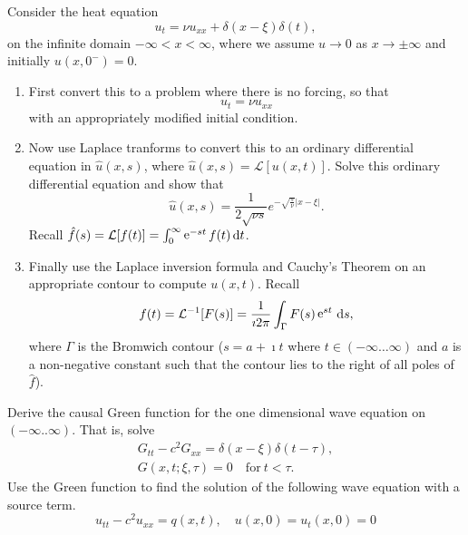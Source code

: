 {\begin{Exercise}
  Consider the heat equation
  \[ 
  u_t = \nu u_{x x} + \delta(x-\xi) \delta(t), 
  \]
  on the infinite domain $-\infty < x < \infty$, where we assume $u \to 0$ as
  $x \to \pm \infty$ and initially $u(x,0^-) = 0$. 

  \begin{enumerate}
  \item 
    First convert this to a problem where there is no forcing, so that 
    \[ 
    u_t = \nu u_{x x} 
    \]
    with an appropriately modified initial condition. 
  \item 
    Now use Laplace tranforms to convert this to an ordinary differential 
    equation in $\hat{u}(x,s)$, where
    $\hat{u}(x,s) = \mathcal{L}[u(x,t)]$. Solve this ordinary differential 
    equation and show that
    \[ 
    \hat{u}(x,s) = \frac{1}{2 \sqrt{\nu s}}e^{-\sqrt{\frac{s}{\nu}}|x-\xi|} .
    \]
    Recall $\hat{f}(s) = \mathcal{L}[f(t)] = \int_0^\infty \mathop{\mathrm{e}}\nolimits^{-st} f(t)\,\mathrm{d} t$.
  \item
    Finally use the Laplace inversion formula and Cauchy's Theorem on 
    an appropriate contour to compute $u(x,t)$. Recall 
    \[ 
    f(t) = \mathcal{L}^{-1}[F(s)] = \frac{1}{\imath 2 \pi} \int_\Gamma F(s) \mathop{\mathrm{e}}\nolimits^{s t}\,\mathrm{d} s,
    \]
    where $\Gamma$ is the Bromwich contour ($s = a + \imath t$ where $t \in (-\infty \ldots \infty)$ and 
    $a$ is a non-negative constant such that the contour lies to the 
    right of all poles of $\hat{f}$). 
  \end{enumerate}
\end{Exercise}







\begin{Exercise}
  \label{wave_eqn_causal_green_fcn}
  Derive the causal Green function for the one dimensional wave equation on 
  $(-\infty..\infty)$.  That is, solve
  \begin{gather*}
    G_{t t} - c^2 G_{x x} = \delta(x - \xi) \delta(t - \tau), 
    \\
    G(x,t;\xi,\tau) = 0 \quad \mathrm{for}\ t < \tau.
  \end{gather*}
  Use the Green function to find the solution of the following wave equation 
  with a source term.
  \[
  u_{t t} - c^2 u_{x x} = q(x,t), \quad u(x,0) = u_t(x,0) = 0
  \]
\end{Exercise}





}
